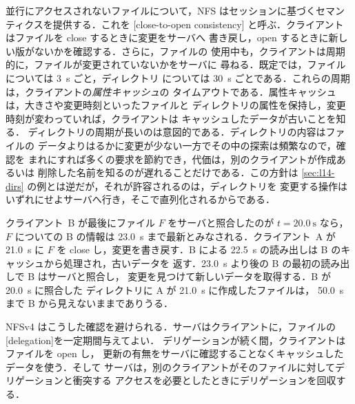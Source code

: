 \documentclass[../main.tex]{subfiles}
\begin{document}
並行にアクセスされないファイルについて，NFS はセッションに基づくセマン
ティクスを提供する．これを
[close-to-open consistency]%
と呼ぶ．クライアントはファイルを close するときに変更をサーバへ
書き戻し，open するときに新しい版がないかを確認する．さらに，ファイルの
使用中も，クライアントは周期的に，ファイルが変更されていないかをサーバに
尋ねる．既定では，ファイルについては \SI{3}{\second} ごと，ディレクトリ
については \SI{30}{\second} ごとである．これらの周期は，クライアントの\emph{属性キャッシュ}の
タイムアウトである．属性キャッシュは，大きさや変更時刻といったファイルと
ディレクトリの属性を保持し，変更時刻が変わっていれば，クライアントは
キャッシュしたデータが古いことを知る．
ディレクトリの周期が長いのは意図的である．ディレクトリの内容はファイルの
データよりはるかに変更が少ない一方でその中の探索は頻繁なので，確認を
まれにすれば多くの要求を節約でき，代価は，別のクライアントが作成あるいは
削除した名前を知るのが遅れることだけである．この方針は
\cref{sec:l14-dirs} の例とは逆だが，それが許容されるのは，ディレクトリを
変更する操作はいずれにせよサーバへ行き，そこで直列化されるからである．

\begin{example}
  クライアント~B が最後にファイル $F$ をサーバと照合したのが
  $t=\SI{20.0}{\second}$ なら，$F$ についての B の情報は
  \SI{23.0}{\second} まで最新とみなされる．クライアント~A が
  \SI{21.0}{\second} に $F$ を close し，変更を書き戻す．B による
  \SI{22.5}{\second} の読み出しは B のキャッシュから処理され，古いデータを
  返す．\SI{23.0}{\second} より後の B の最初の読み出しで B はサーバと照合し，
  変更を見つけて新しいデータを取得する．B が \SI{20.0}{\second} に照合した
  ディレクトリに A が \SI{21.0}{\second} に作成したファイルは，
  \SI{50.0}{\second} まで B から見えないままでありうる．
\end{example}

NFSv4 はこうした確認を避けられる．サーバはクライアントに，ファイルの
[delegation]を一定期間与えてよい．
デリゲーションが続く間，クライアントはファイルを open し，
更新の有無をサーバに確認することなくキャッシュしたデータを使う．そして
サーバは，別のクライアントがそのファイルに対してデリゲーションと衝突する
アクセスを必要としたときにデリゲーションを回収する．
\end{document}

